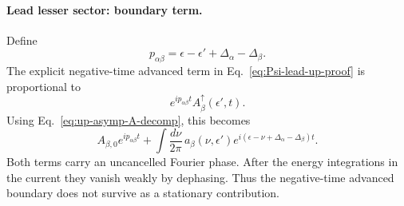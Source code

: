 \documentclass[
 reprint,
 superscriptaddress,
 amsmath,amssymb,
 aps,prb,
 longbibliography,
 floatfix
]{revtex4-2}
\begin{document}
\paragraph{Lead lesser sector: boundary term.}
Define
\begin{equation*}
p_{\alpha\beta}
=
\epsilon-\epsilon'
+\Delta_\alpha-\Delta_\beta.
\end{equation*}
The explicit negative-time advanced term in Eq.~\eqref{eq:Psi-lead-up-proof} is proportional to
\begin{equation*}
e^{ip_{\alpha\beta}t}
A_\beta^\uparrow(\epsilon',t).
\end{equation*}
Using Eq.~\eqref{eq:up-asymp-A-decomp}, this becomes
\begin{equation*}
A_{\beta,0}e^{ip_{\alpha\beta}t}
+
\int\frac{d\nu}{2\pi}\,
a_\beta(\nu,\epsilon')
 e^{i(\epsilon-\nu+\Delta_\alpha-\Delta_\beta)t}.
\end{equation*}
Both terms carry an uncancelled Fourier phase. After the energy integrations in the current they vanish weakly by dephasing. Thus the negative-time advanced boundary does not survive as a stationary contribution.
\end{document}
